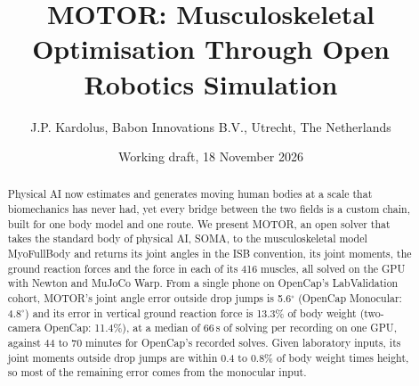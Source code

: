 \documentclass[11pt]{article}
\title{\vspace{-1.5em}MOTOR: Musculoskeletal Optimisation Through Open Robotics Simulation}
\author{J.P. Kardolus, Babon Innovations B.V., Utrecht, The Netherlands}
\date{Working draft, 18 November 2026\vspace{-0.8em}}
\newcommand{\dg}{\ensuremath{^\circ}}
\begin{document}
\maketitle

\begin{abstract}
\noindent Physical AI now estimates and generates moving human bodies at a scale that biomechanics has never had,
yet every bridge between the two fields is a custom chain, built for one body model and one route. We present MOTOR,
an open solver that takes the standard body of physical AI, SOMA, to the musculoskeletal model MyoFullBody and returns
its joint angles in the ISB convention, its joint moments, the ground reaction forces and the force in each of its 416
muscles, all solved on the GPU with Newton and MuJoCo Warp. From a single phone on OpenCap's LabValidation cohort,
MOTOR's joint angle error outside drop jumps is 5.6\dg{} (OpenCap Monocular: 4.8\dg) and its error in vertical ground
reaction force is 13.3\% of body weight (two-camera OpenCap: 11.4\%), at a median of 66\,s of solving per recording on
one GPU, against 44 to 70 minutes for OpenCap's recorded solves. Given laboratory inputs, its joint moments outside
drop jumps are within 0.4 to 0.8\% of body weight times height, so most of the remaining error comes from the
monocular input.
\end{abstract}
\end{document}
